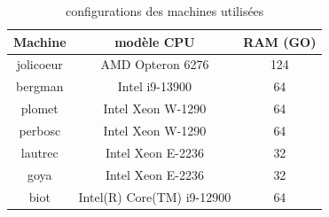 \documentclass{backend}
\begin{document}

\begin{center}
    \begin{table}[ht]
        \centering
        \caption{configurations des machines utilisées}
        \label{tab:configurations}
        \begin{tabular}{|c|c|c|}
            \toprule
            Machine & modèle CPU & RAM (GO) \\
            \midrule
                \makeatletter\def\@currentlabel{jolicoeur}\makeatother
                jolicoeur\label{jolicoeur} & AMD Opteron 6276 & 124 \\
                \makeatletter\def\@currentlabel{bergman}\makeatother
                bergman\label{bergman}  & Intel i9-13900 & 64 \\
                \makeatletter\def\@currentlabel{plomet}\makeatother
                plomet\label{plomet}  & Intel Xeon W-1290 & 64 \\
                \makeatletter\def\@currentlabel{perbosc}\makeatother
                perbosc\label{perbosc}  & Intel Xeon W-1290 & 64 \\
                \makeatletter\def\@currentlabel{lautrec}\makeatother
                lautrec\label{lautrec}  & Intel Xeon E-2236 & 32 \\
                \makeatletter\def\@currentlabel{goya}\makeatother
                goya\label{goya}  & Intel Xeon E-2236 & 32 \\
                
                \makeatletter\def\@currentlabel{biot}\makeatother
                biot\label{biot} & Intel(R) Core(TM) i9-12900 & 64 \\
            \bottomrule
        \end{tabular}
    \end{table}
\end{center}
\end{document}

